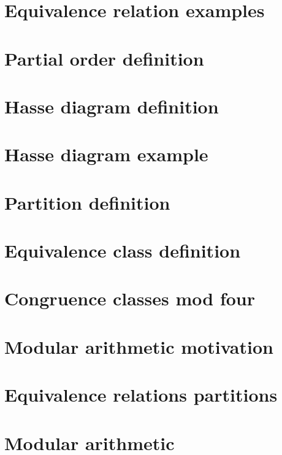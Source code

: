 \section*{Equivalence relation examples}

\vfill
\section*{Partial order definition}

\vfill
\section*{Hasse diagram definition}

\vfill
\section*{Hasse diagram example}

\vfill
\section*{Partition definition}

\vfill
\section*{Equivalence class definition}

\vfill
\section*{Congruence classes mod four}

\vfill
\section*{Modular arithmetic motivation}

\vfill
\section*{Equivalence relations partitions}

\vfill
\section*{Modular arithmetic}

\vfill
